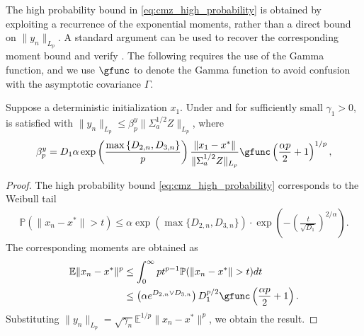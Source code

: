 \documentclass[11pt]{article}
\begin{document}
The high probability bound in \eqref{eq:cmz_high_probability} is obtained by exploiting a recurrence of the exponential moments, rather than a direct bound on $\lVert y_n \rVert_{L_p}$. 
A standard argument can be used to recover the corresponding moment bound and verify . 
The following requires the use of the Gamma function, and we use $\gfunc$ to denote the Gamma function to avoid confusion with the asymptotic covariance $\Gamma$.
\begin{proposition}\label{prop:weibull_moment}
    Suppose a deterministic initialization $x_1$. 
    Under  and for sufficiently small $\gamma_1 > 0$,  is satisfied with $\lVert y_n \rVert_{L_p} \leq \beta_p^y \lVert \Sigma_a^{1/2}Z \rVert_{L_p}$, where 
    \begin{equation}
        \beta_p^y = D_1 \alpha \exp \left(\frac{\max\left\{D_{2, n}, D_{3, n} \right\}}{p}  \right) \frac{\lVert x_1 - x^* \rVert}{\lVert \Sigma_a^{1/2}Z \rVert_{L_p}}  
         \gfunc \left(\frac{\alpha p}{2} + 1\right)^{1/p}
        , 
    \end{equation}
\end{proposition}
\begin{proof}
    The high probability bound \eqref{eq:cmz_high_probability} corresponds to the Weibull tail 
    \begin{align*}
    \mathbb{P}\left( \lVert x_{n} - x^* \rVert > t \right) 
    \leq 
    \alpha \exp \left(\max\{D_{2, n}, D_{3,n}\} \right)
    \cdot 
    \exp \left( 
    - \left(\frac{t}{\sqrt{D_{1}}} \right)^{2/\alpha}
    \right) . 
\end{align*}
The corresponding moments are obtained as 
\begin{align*}
    \mathbb{E} \lVert x_{n} - x^* \rVert^p 
    &\leq 
    \int_0^\infty p t^{p-1} \mathbb{P}(\lVert x_{n} - x^* \rVert > t) dt 
    \\ &\leq 
    \left(\alpha e^{D_{2, n} \vee D_{3, n}} \right) D_{1}^{p/2} \gfunc \left(\frac{\alpha p}{2} +1\right) .         
\end{align*}
Substituting $\lVert y_n \rVert_{L_p} = \sqrt{\gamma_n} \mathbb{E}^{1/p} \lVert x_n - x^* \rVert^p$, we obtain the result. 
\end{proof}
\end{document}

